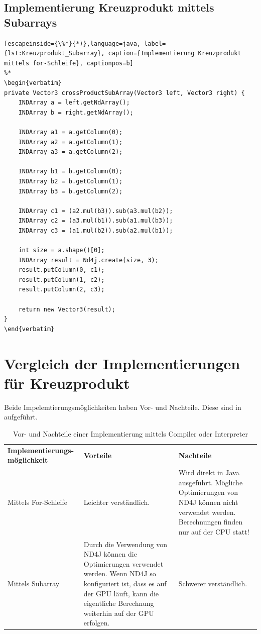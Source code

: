 \subsection{Implementierung Kreuzprodukt mittels Subarrays}
\begin{lstlisting}[escapeinside={\%*}{*)},language=java, label={lst:Kreuzprodukt_Subarray}, caption={Implementierung Kreuzprodukt mittels for-Schleife}, captionpos=b]
%*
\begin{verbatim}
private Vector3 crossProductSubArray(Vector3 left, Vector3 right) {
    INDArray a = left.getNdArray();
    INDArray b = right.getNdArray();

    INDArray a1 = a.getColumn(0);
    INDArray a2 = a.getColumn(1);
    INDArray a3 = a.getColumn(2);

    INDArray b1 = b.getColumn(0);
    INDArray b2 = b.getColumn(1);
    INDArray b3 = b.getColumn(2);

    INDArray c1 = (a2.mul(b3)).sub(a3.mul(b2));
    INDArray c2 = (a3.mul(b1)).sub(a1.mul(b3));
    INDArray c3 = (a1.mul(b2)).sub(a2.mul(b1));

    int size = a.shape()[0];
    INDArray result = Nd4j.create(size, 3);
    result.putColumn(0, c1);
    result.putColumn(1, c2);
    result.putColumn(2, c3);

    return new Vector3(result);
}
\end{verbatim}
\end{lstlisting}

\section{Vergleich der Implementierungen für Kreuzprodukt}
Beide Impelemtierungsmöglichkeiten haben Vor- und Nachteile.
Diese sind in  aufgeführt.
\begin{table}[H]
	\centering
	\begin{tabular}{ | p{4cm} | p{5.5cm} | p{5.5cm} | }
		\hline \rowcolor{gray!15}
		\textbf{Implementierungs-möglichkeit} & \textbf{Vorteile} & \textbf{Nachteile} \\ \hhline{|=|=|=|}
		Mittels For-Schleife & Leichter verständlich. & Wird direkt in Java ausgeführt. \newline Mögliche Optimierungen von ND4J können nicht verwendet werden. Berechnungen finden nur auf der \ac{CPU} statt! \\ \hline
		Mittels Subarray & Durch die Verwendung von ND4J können die Optimierungen verwendet werden. Wenn ND4J so konfiguriert ist, dass es auf der \ac{GPU} läuft, kann die eigentliche Berechnung weiterhin auf der \ac{GPU} erfolgen. & Schwerer verständlich. \\ \hline
	\end{tabular}
	\caption{Vor- und Nachteile einer Implementierung mittels Compiler oder Interpreter}
	\label{tab:Vorteile_Kreuzprodukt_Implementierungen}
\end{table}

